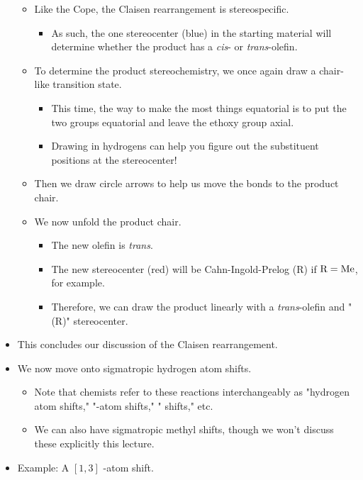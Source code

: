 \documentclass[../notes.tex]{subfiles}
\begin{document}
\begin{itemize}
\begin{itemize}
        \item Like the Cope, the Claisen rearrangement is stereospecific.
        \begin{itemize}
            \item As such, the one stereocenter (blue) in the starting material will determine whether the product has a \emph{cis}- or \emph{trans}-olefin.
        \end{itemize}
        \item To determine the product stereochemistry, we once again draw a chair-like transition state.
        \begin{itemize}
            \item This time, the way to make the most things equatorial is to put the two  groups equatorial and leave the ethoxy group axial.
            \item Drawing in hydrogens can help you figure out the substituent positions at the stereocenter!
        \end{itemize}
        \item Then we draw circle arrows to help us move the bonds to the product chair.
        \item We now unfold the product chair.
        \begin{itemize}
            \item The new olefin is \emph{trans}.
            \item The new stereocenter (red) will be Cahn-Ingold-Prelog (R) if $\ce{R}=\ce{Me}$, for example.
            \item Therefore, we can draw the product linearly with a \emph{trans}-olefin and "(R)" stereocenter.
        \end{itemize}
    \end{itemize}
    \item This concludes our discussion of the Claisen rearrangement.
    \item We now move onto sigmatropic hydrogen atom shifts.
    \begin{itemize}
        \item Note that chemists refer to these reactions interchangeably as "hydrogen atom shifts," "-atom shifts," " shifts," etc.
        \item We can also have sigmatropic methyl shifts, though we won't discuss these explicitly this lecture.
    \end{itemize}
    \item Example: A $[1,3]$ -atom shift.
    \begin{figure}[h!]

\end{figure}
\end{itemize}
\end{document}
